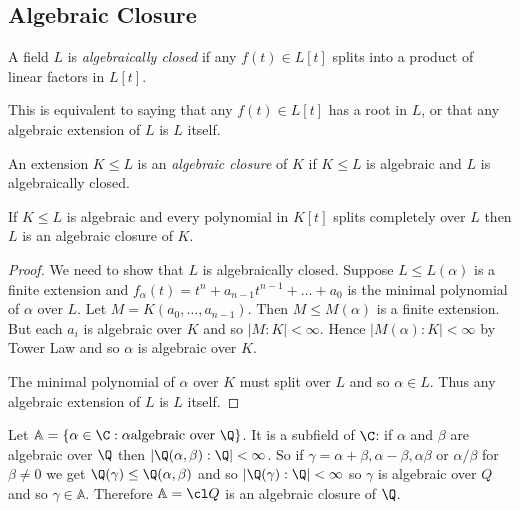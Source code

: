 \documentclass[a4paper]{article}
\begin{document}
\subsection{Algebraic Closure}

\begin{definition}
  A field \(L\) is \emph{algebraically closed} if any \(f(t) \in L[t]\) splits into a product of linear factors in \(L[t]\).
\end{definition}

\begin{remark}
  This is equivalent to saying that any \(f(t) \in L[t]\) has a root in \(L\), or that any algebraic extension of \(L\) is \(L\) itself.
\end{remark}

\begin{definition}
  An extension \(K \leq L\) is an \emph{algebraic closure} of \(K\) if \(K \leq L\) is algebraic and \(L\) is algebraically closed.
\end{definition}

\begin{lemma}
  \label{lem:characterisation of algebraic closure}
  If \(K \leq L\) is algebraic and every polynomial in \(K[t]\) splits completely over \(L\) then \(L\) is an algebraic closure of \(K\).
\end{lemma}

\begin{proof}
  We need to show that \(L\) is algebraically closed. Suppose \(L \leq L(\alpha)\) is a finite extension and \(f_\alpha(t) = t^n + a_{n - 1}t^{n - 1} + \dots + a_0\) is the minimal polynomial of \(\alpha\) over \(L\). Let \(M = K(a_0, \dots, a_{n - 1})\). Then \(M \leq M(\alpha)\) is a finite extension. But each \(a_i\) is algebraic over \(K\) and so \(|M:K| < \infty\). Hence \(|M(\alpha):K| < \infty\) by Tower Law and so \(\alpha\) is algebraic over \(K\).

  The minimal polynomial of \(\alpha\) over \(K\) must split over \(L\) and so \(\alpha \in L\). Thus any algebraic extension of \(L\) is \(L\) itself.
\end{proof}

\begin{eg}
  Let \(\mathbb A = \{\alpha \in \C: \alpha \text{algebraic over } \Q\}\). It is a subfield of \(\C\): if \(\alpha\) and \(\beta\) are algebraic over \(\Q\) then \(|\Q(\alpha, \beta): \Q| < \infty\). So if \(\gamma = \alpha + \beta, \alpha - \beta, \alpha\beta\) or \(\alpha/\beta\) for \(\beta \neq 0\) we get \(\Q(\gamma) \leq \Q(\alpha, \beta)\) and so \(|\Q(\gamma):\Q| < \infty\) so \(\gamma\) is algebraic over \(Q\) and so \(\gamma \in \mathbb A\). Therefore \(\mathbb A = \cl Q\) is an algebraic closure of \(\Q\).
\end{eg}
\end{document}
